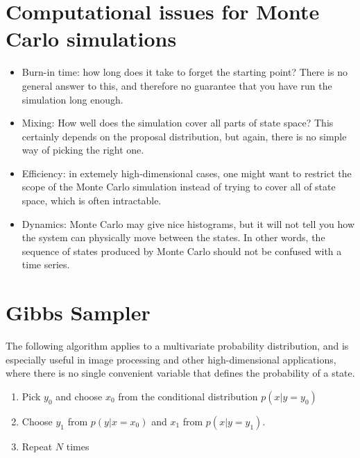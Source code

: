 \documentclass[11pt]{book}
\begin{document}
\section{Computational issues for Monte Carlo simulations} 
\begin{itemize} 
\item Burn-in time: how long does it take to forget the starting point? There is no general answer to this, and therefore no guarantee that you have
run the simulation long enough.

\item Mixing: How well does the simulation cover all parts of state space? This certainly depends on the proposal distribution, but again, there is no
simple way of picking the right one.

\item Efficiency: in extemely high-dimensional cases, one might want to restrict the scope of the Monte Carlo simulation instead of trying to 
cover all of state space, which is often intractable.

\item Dynamics: Monte Carlo may give nice histograms, but it will not tell you how the system can physically move between the states. In other words, 
the sequence of states produced by Monte Carlo should not be confused with a time series.
\end{itemize}

\section{Gibbs Sampler}
The following algorithm applies to a multivariate probability distribution,
and is especially useful in image processing and other high-dimensional
applications, where there is no single convenient variable that defines the probability of a state. 

\begin{enumerate}
\item Pick $y_0$ and choose $x_0$ from the conditional distribution $p(x | y=y_0)$ 

\item Choose $y_1$ from $p(y | x=x_0)$ and $x_1$ from $p(x | y=y_1)$.

\item Repeat $N$ times  
\end{enumerate}
\end{document}
